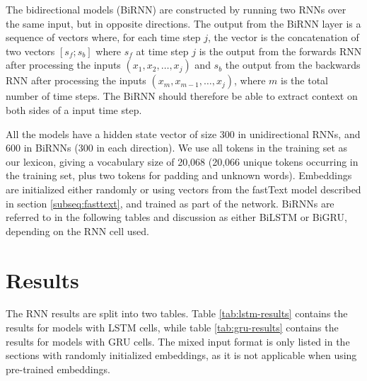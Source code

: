 The bidirectional models (BiRNN) are constructed by running two \acp{RNN}
over the same input, but in opposite directions. The output from the BiRNN
layer is a sequence of vectors where, for each time step $j$, the vector is
the concatenation of two vectors $[s_f;s_b]$ where $s_f$ at time step $j$ is
the output from the forwards \ac{RNN} after processing the inputs $(x_1, x_2,
\ldots, x_j)$ and $s_b$ the output from the backwards \ac{RNN} after
processing the inputs $(x_m, x_{m-1}, \ldots, x_j)$, where $m$ is the total
number of time steps. The BiRNN should therefore be able to extract context
on both sides of a input time step.

All the models have a hidden state vector of size 300 in unidirectional
\acp{RNN}, and 600 in BiRNNs (300 in each direction). We use all tokens in
the training set as our lexicon, giving a vocabulary size of 20,068 (20,066
unique tokens occurring in the training set, plus two tokens for padding and
unknown words). Embeddings are initialized either randomly or using vectors
from the fastText model described in section \ref{subseq:fasttext}, and
trained as part of the network. BiRNNs are referred to in the following
tables and discussion as either BiLSTM or BiGRU, depending on the RNN cell
used.


\section{Results}

The RNN results are split into two tables. Table \ref{tab:lstm-results}
contains the results for models with \ac{LSTM} cells, while table
\ref{tab:gru-results} contains the results for models with \ac{GRU} cells.
The mixed input format is only listed in the sections with randomly
initialized embeddings, as it is not applicable when using pre-trained
embeddings.

